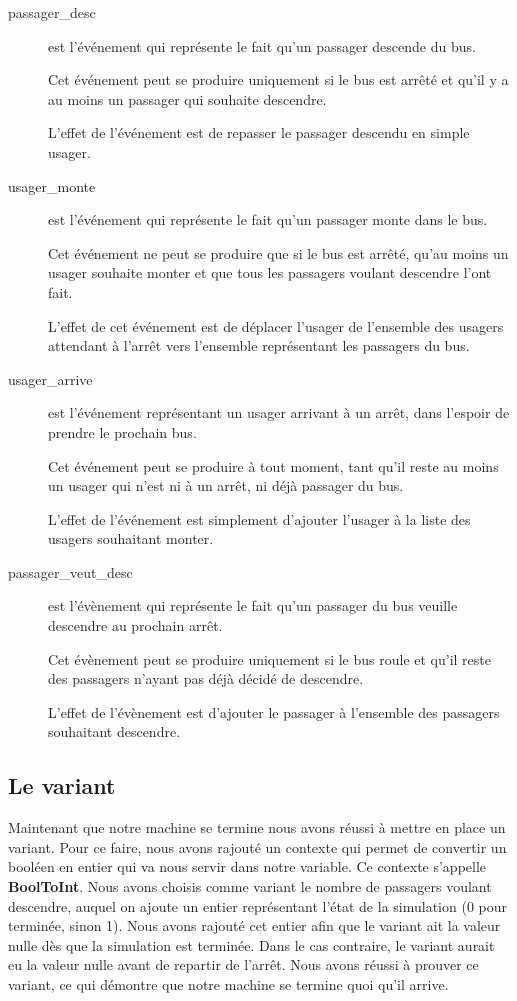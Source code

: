 \documentclass[a4paper,titlepage]{report}
\begin{document}
\begin{description}
			\item[passager\_desc] est l'événement qui représente le fait qu'un passager descende du bus.
			
			Cet événement peut se produire uniquement si le bus est arrêté et qu'il y a au moins un passager qui souhaite descendre.
			
			L'effet de l'événement est de repasser le passager descendu en simple usager. \\
			
			\item[usager\_monte] est l'événement qui représente le fait qu'un passager monte dans le bus.
			
			Cet événement ne peut se produire que si le bus est arrêté, qu'au moins un usager souhaite monter et que tous les passagers voulant descendre l'ont fait.
			
			L'effet de cet événement est de déplacer l'usager de l'ensemble des usagers attendant à l'arrêt vers l'ensemble représentant les passagers du bus.\\
		
			\item[usager\_arrive] est l'événement représentant un usager arrivant à un arrêt, dans l'espoir de prendre le prochain bus.
			
			Cet événement peut se produire à tout moment, tant qu'il reste au moins un usager qui n'est ni à un arrêt, ni déjà passager du bus.
			
			L'effet de l'événement est simplement d'ajouter l'usager à la liste des usagers souhaitant monter.\\
			
			\item[passager\_veut\_desc] est l'évènement qui représente le fait qu'un passager du bus veuille descendre au prochain arrêt.
			
			Cet évènement peut se produire uniquement si le bus roule et qu'il reste des passagers n'ayant pas déjà décidé de descendre.
			
			L'effet de l'évènement est d'ajouter le passager à l'ensemble des passagers souhaitant descendre.\\
		\end{description}

	\subsection{Le variant}
		Maintenant que notre machine se termine nous avons réussi à mettre en place un variant. Pour ce faire, nous avons rajouté un contexte qui permet de convertir un booléen en entier qui va nous servir dans notre variable. Ce contexte s'appelle \textbf{BoolToInt}. Nous avons choisis comme variant le nombre de passagers voulant descendre, auquel on ajoute un entier représentant l'état de la simulation (0 pour terminée, sinon 1). Nous avons rajouté cet entier afin que le variant ait la valeur nulle dès que la simulation est terminée. Dans le cas contraire, le variant aurait eu la valeur nulle avant de repartir de l'arrêt. Nous avons réussi à prouver ce variant, ce qui démontre que notre machine se termine quoi qu'il arrive.
	
\end{document}
